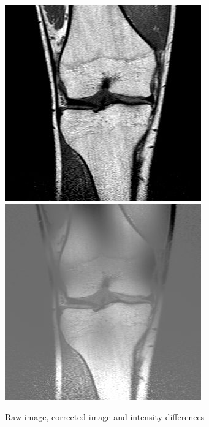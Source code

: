 \begin{figure}[H]
  \includegraphics[width=\linewidth]{imgs/corr.jpg}
\endminipage\hfill
{}%
  \includegraphics[width=\linewidth]{imgs/diff2.jpg}
\endminipage
\caption{Raw image, corrected image and intensity differences}
\end{figure}


